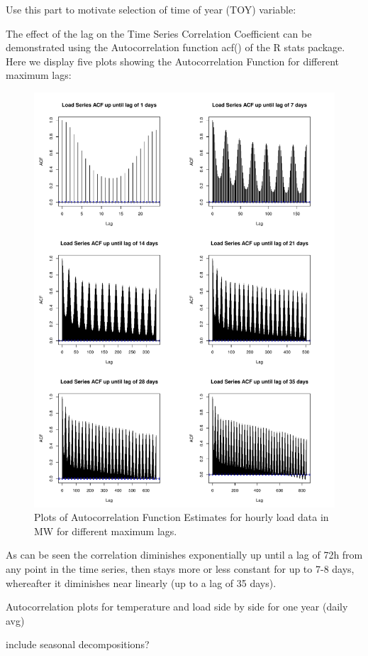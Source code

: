 \documentclass[conference]{IEEEtran}
\begin{document}
Use this part to motivate selection of time of year (TOY) variable:\par
The effect of the lag on the Time Series Correlation Coefficient can be demonstrated using the Autocorrelation function acf() of the R stats package. Here we display five plots showing the Autocorrelation Function for different maximum lags: 
\begin{figure}[h!]
\centering
\includegraphics[width=\linewidth]{../data/analysis/acf-load-lag-var-days_font.pdf}
\caption{Plots of Autocorrelation Function Estimates for hourly load data in MW for different maximum lags.}
\label{fig:load-acf}
\end{figure}
As can be seen the correlation diminishes exponentially up until a lag of 72h from any point in the time series, then stays more or less constant for up to 7-8 days, whereafter it diminishes near linearly (up to a lag of 35 days).\par 
Autocorrelation plots for temperature and load side by side for one year (daily avg)\par
include seasonal decompositions?
\end{document}
